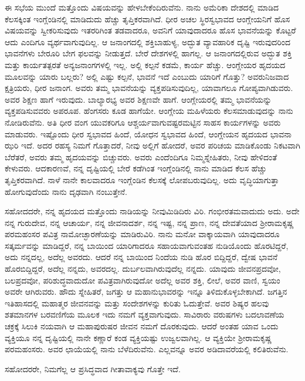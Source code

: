 ಈ ಸಭೆಯ ಮುಂದೆ ಮತ್ತೊಂದು ವಿಷಯವನ್ನು ಹೇಳಬೇಕೆಂದಿರುವೆನು. ನಾನು ಅಮೆರಿಕಾ ದೇಶದಲ್ಲಿ ಮಾಡಿದ ಕೆಲಸಕ್ಕಿಂತ ಇಂಗ್ಲೆಂಡಿನಲ್ಲಿ ಮಾಡಿದುದು ಹೆಚ್ಚು ತೃಪ್ತಿಕರವಾಗಿದೆ. ಧೀರ ಅಚಲ ಸ್ಥಿರಸ್ವಭಾವದ ಆಂಗ್ಲೇಯನಿಗೆ ಹೊಸ ವಿಷಯವನ್ನು ಸ್ವೀಕರಿಸುವುದು ಇತರರಿಗಿಂತ ತಡವಾದರೂ, ಅವನಿಗೆ ಯಾವುದಾದರೂ ಹೊಸ ಭಾವನೆಯನ್ನು ಕೊಟ್ಟರೆ ಆದು ಎಂದಿಗೂ ವ್ಯರ್ಥವಾಗುವುದಿಲ್ಲ. ಆ ಜನಾಂಗದಲ್ಲಿ ಶಕ್ತಿಬಾಹುಳ್ಯ, ಅದ್ಭುತ ವ್ಯಾವಹಾರಿಕ ದೃಷ್ಟಿ ಇರುವುದರಿಂದ ಭಾವನೆಗಳು ಬೇರೂರಿ ಬೇಗ ಫಲವನ್ನು ನೀಡುತ್ತದೆ. ಬೇರೆ ದೇಶಗಳಲ್ಲಿ ಹಾಗಲ್ಲ. ಆ ಜನಾಂಗದಲ್ಲಿರುವ ಅದ್ಭುತ ಶಕ್ತಿ ಮತ್ತು ಕಾರ್ಯತತ್ಪರತೆ ಅನ್ಯಜನಾಂಗಗಳಲ್ಲಿ ಇಲ್ಲ. ಅಲ್ಲಿ ಕಲ್ಪನೆ ಕಡಮೆ, ಕಾರ್ಯ ಹೆಚ್ಚು. ಆಂಗ್ಲೇಯರ ಹೃದಯದ ಮೂಲವನ್ನು ಯಾರು ಬಲ್ಲರು? ಅಲ್ಲಿ ಎಷ್ಟು ಕಲ್ಪನೆ, ಭಾವನೆ ಇದೆ ಎಂಬುದು ಯಾರಿಗೆ ಗೊತ್ತು? ಅವರುನಿಜವಾದ ಕ್ಷತ್ರಿಯರು, ಧೀರ ಜನಾಂಗ. ಅವರು ತಮ್ಮ ಭಾವನೆಯನ್ನು ವ್ಯಕ್ತಪಡಿಸುವುದಿಲ್ಲ, ಯಾವಾಗಲೂ ಗೋಪ್ಯವಾಗಿಡುವರು. ಅವರ ಶಿಕ್ಷಣ ಹಾಗೆ ಇರುವುದು. ಬಾಲ್ಯಾರಭ್ಯ ಅವರ ಶಿಕ್ಷಣವೇ ಹಾಗೆ. ಆಂಗ್ಲೇಯರಲ್ಲಿ ತಮ್ಮ ಭಾವನೆಯನ್ನು ವ್ಯಕ್ತಪಡಿಸುವವರು ಅಪರೂಪ. ಹೆಂಗಸರು ಕೂಡ ಹಾಗೆಯೇ. ಆಂಗ್ಲೇಯ ಮಹಿಳೆಯರು ಕೆಲಸಮಾಡುವುದನ್ನು ನಾನು ನೋಡಿರುವೆನು. ಅತಿ ಧೀರ ವಂಗ ಯುವಕರಿಗೂ ಆಶ್ಚರ್ಯವಾಗುವಷ್ಟರಮಟ್ಟಿನ ಸಾಹಸ ಕಾರ್ಯಗಳನ್ನು ಅವರು ಮಾಡುವರು. ಇಷ್ಟೊಂದು ಧೀರ ಸ್ವಭಾವದ ಹಿಂದೆ, ಯೋಧನ ಸ್ವಭಾವದ ಹಿಂದೆ, ಆಂಗ್ಲೇಯನ ಹೃದಯದ ಭಾವನಾ ಝರಿ ಇದೆ. ಅದರ ರಹಸ್ಯ ನಿಮಗೆ ಗೊತ್ತಾದರೆ, ನೀವು ಅಲ್ಲಿಗೆ ಹೋದರೆ, ಅವರ ಪರಿಚಯ ಮಾಡಿಕೊಂಡು ನಿಕಟವಾಗಿ ಬೆರೆತರೆ, ಅವರು ತಮ್ಮ ಹೃದಯವನ್ನು ಬಿಚ್ಚುವರು. ಅವರು ಎಂದೆಂದಿಗೂ ನಿಮ್ಮಸ್ನೇಹಿತರು, ನೀವು ಹೇಳಿದಂತೆ ಕೇಳುವರು. ಆದಕಾರಣವೆ, ನನ್ನ ದೃಷ್ಟಿಯಲ್ಲಿ ಬೇರೆ ಕಡೆಗಿಂತ ಇಂಗ್ಲೆಂಡಿನಲ್ಲಿ ನಾನು ಮಾಡಿದ ಕೆಲಸ ಹೆಚ್ಚು ತೃಪ್ತಿಕರವಾಗಿದೆ. ನಾಳೆ ನಾನೇ ಕಾಲವಾದರೂ ಇಂಗ್ಲೆಂಡಿನ ಕೆಲಸಕ್ಕೆ ಲೋಪಬರುವುದಿಲ್ಲ. ಅದು ವೃದ್ಧಿಯಾಗುತ್ತಾ ಹೋಗುವುದೆಂದು ನಾನು ದೃಢವಾಗಿ ನಂಬುತ್ತೇನೆ. 

ಸಹೋದದರೇ, ನನ್ನ ಹೃದಯದ ಮತ್ತೊಂದು ನಾಡಿಯನ್ನು ನೀವುಮಿಡಿದಿರು ವಿರಿ. ಗಂಭೀರತಮವಾದುದು ಅದು. ಅದೇ ನನ್ನ ಗುರುದೇವ, ನನ್ನ ಆಚಾರ್ಯ, ನನ್ನ ಜೀವನಾದರ್ಶ, ನನ್ನ ಇಷ್ಟ, ನನ್ನ ಪ್ರಾಣ, ನನ್ನ ದೇವತೆಯಾದ ಶ‍್ರೀರಾಮಕೃಷ್ಣ ಪರಮಹಂಸರ ಪವಿತ್ರ ನಾಮೋಚ್ಛಾರಣೆಯನ್ನು ಮಾಡಿರುವಿರಿ. ನಾನು ಮನೋ ವಾಕ್ಕಾಯವಾಗಿ ಯಾವುದಾದರೂ ಸತ್ಕರ್ಮವನ್ನು ಮಾಡಿದ್ದರೆ, ನನ್ನ ಬಾಯಿಂದ ಯಾರಿಗಾದರೂ ಸಹಾಯವಾಗುವಂತಹ ನುಡಿಯೊಂದು ಹೊರಟಿದ್ದರೆ, ಅದು ನನ್ನದಲ್ಲ, ಅದೆಲ್ಲ ಅವರದು. ಆದರೆ ನನ್ನ ಬಾಯಿಂದ ನಿಂದೆಯ ನುಡಿ ಹೊರ ಬಿದ್ದಿದ್ದರೆ, ದ್ವೇಷ ಭಾವನೆ ಹೊರಬಿದ್ದಿದ್ದರೆ, ಅದೆಲ್ಲ ನನ್ನದು, ಅವರದಲ್ಲ. ದುರ್ಬಲವಾಗಿರುವುದೆಲ್ಲ ನನ್ನದು. ಯಾವುದು ಜೀವನಪ್ರದವೋ, ಬಲಪ್ರದವೋ, ಪರಿಶುದ್ಧವಾದುದೋ ಪವಿತ್ರವಾಗಿರುವುದೋ ಅದೆಲ್ಲ ಅವರ ಶಕ್ತಿ, ಲೀಲೆ, ಅವರ ವಾಣಿ, ಸ್ವಯಂ ಅವರೇ ಆಗಿರುವರು. ಹೌದು ಸ್ನೇಹಿತರೆ, ಜಗತ್ತು ಆ ಮಹಾನುಭಾವರನ್ನು ಇನ್ನೂ ತಿಳಿದುಕೊಳ್ಳಬೇಕಾಗಿದೆ. ಜಗತ್ತಿನ ಇತಿಹಾಸದಲ್ಲಿ ಮಹಾತ್ಮರ ಜೀವನವನ್ನು ಮತ್ತು ಸಂದೇಶಗಳನ್ನು ಕುರಿತು ಓದುತ್ತೇವೆ. ಅವರ ಶಿಷ್ಯರ ಹಲವು ಶತಮಾನಗಳ ಬರವಣಿಗೆಯ ಮೂಲಕ ಇದು ನಮಗೆ ವ್ಯಕ್ತವಾಗುವುದು. ಸಾವಿರಾರು ವರುಷಗಳು ಬದಲಾವಣೆಯ ಚಕ್ರಕ್ಕೆ ಸಿಲುಕಿ ನಯವಾಗಿ ಆ ಮಹಾಪುರುಷರ ಜೀವನ ನಮಗೆ ದೊರಕುವುದು. ಆದರೆ ಅಂತಹ ಯಾವ ಒಂದು ವ್ಯಕ್ತಿಯೂ ನನ್ನ ದೃಷ್ಟಿಯಲ್ಲಿ ನಾನೇ ಕಣ್ಣಾರೆ ಕಂಡ ವ್ಯಕ್ತಿಯಷ್ಟು ಉಜ್ವಲವಾಗಿಲ್ಲ. ಆ ವ್ಯಕ್ತಿಯೇ ಶ‍್ರೀರಾಮಕೃಷ್ಣ ಪರಮಹಂಸರು. ಅವರ ಛಾಯೆಯಲ್ಲಿ ನಾನು ಬೆಳೆದಿರುವೆನು. ಎಲ್ಲವನ್ನೂ ಅವರ ಅಡಿದಾವರೆಯಲ್ಲಿ ಕಲಿತಿರುವೆನು. 

ಸಹೋದರರೇ, ನಿಮಗೆಲ್ಲ ಆ ಪ್ರಸಿದ್ಧವಾದ ಗೀತಾವಾಕ್ಯವು ಗೊತ್ತೇ ಇದೆ.

